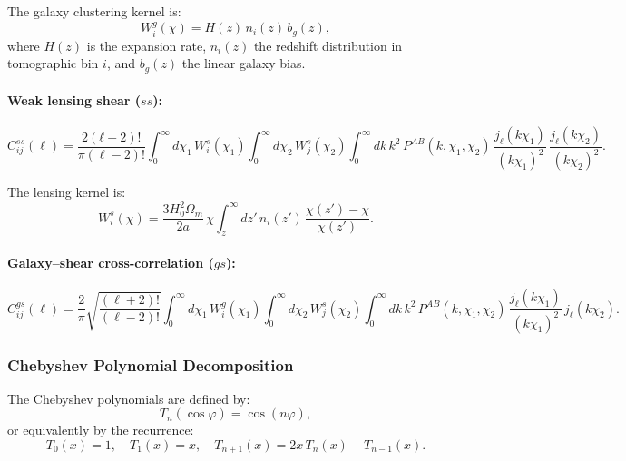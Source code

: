 The galaxy clustering kernel is:
\begin{equation}
    W^g_i(\chi) = H(z)\,n_i(z)\,b_g(z),
\end{equation}
where $H(z)$ is the expansion rate, $n_i(z)$ the redshift distribution in
tomographic bin $i$, and $b_g(z)$ the linear galaxy bias.

\paragraph{Weak lensing shear ($ss$):}
\begin{equation}
    C^{ss}_{ij}(\ell) = \frac{2(ℓ+2)!}{\pi(\ell-2)!}
    \int_0^\infty d\chi_1\, W^s_i(\chi_1)
    \int_0^\infty d\chi_2\, W^s_j(\chi_2)
    \int_0^\infty dk\, k^2\, P^{AB}(k,\chi_1,\chi_2)\,
    \frac{j_\ell(k\chi_1)}{(k\chi_1)^2}\,
    \frac{j_\ell(k\chi_2)}{(k\chi_2)^2}.
    \label{eq:Cl_ss}
\end{equation}

The lensing kernel is:
\begin{equation}
    W^s_i(\chi) = \frac{3H_0^2\Omega_m}{2a}\,\chi
    \int_z^\infty dz'\,n_i(z')\,\frac{\chi(z')-\chi}{\chi(z')}.
    \label{eq:lensing_kernel}
\end{equation}

\paragraph{Galaxy–shear cross-correlation ($gs$):}
\begin{equation}
    C^{gs}_{ij}(\ell) = \frac{2}{\pi}\sqrt{\frac{(\ell+2)!}{(\ell-2)!}}
    \int_0^\infty d\chi_1\, W^g_i(\chi_1)
    \int_0^\infty d\chi_2\, W^s_j(\chi_2)
    \int_0^\infty dk\, k^2\, P^{AB}(k,\chi_1,\chi_2)\,
    \frac{j_\ell(k\chi_1)}{(k\chi_1)^2}\,j_\ell(k\chi_2).
    \label{eq:Cl_gs}
\end{equation}

\subsubsection{Chebyshev Polynomial Decomposition}

The Chebyshev polynomials are defined by:
\begin{equation}
    T_n(\cos\varphi) = \cos(n\varphi),
\end{equation}
or equivalently by the recurrence:
\begin{equation}
    T_0(x)=1, \quad T_1(x)=x, \quad T_{n+1}(x) = 2x\,T_n(x) - T_{n-1}(x).
\end{equation}

